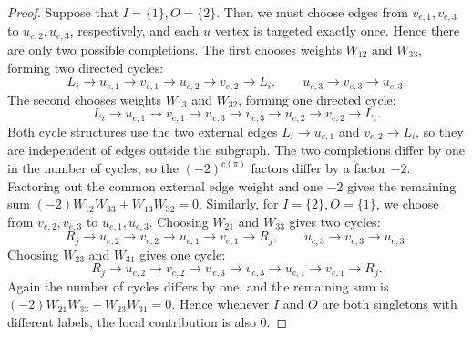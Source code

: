 \documentclass[11pt,a4paper]{article}
\begin{document}
\begin{proof}
Suppose that $I=\{1\},O=\{2\}$. Then we must choose edges from $v_{e,1},v_{e,3}$ to $u_{e,2},u_{e,3}$, respectively, and each $u$ vertex is targeted exactly once. Hence there are only two possible completions. The first chooses weights $W_{12}$ and $W_{33}$, forming two directed cycles:
\[
  L_i\to u_{e,1}\to v_{e,1}\to u_{e,2}
  \to v_{e,2}\to L_i,
  \qquad
  u_{e,3}\to v_{e,3}\to u_{e,3}.
\]
The second chooses weights $W_{13}$ and $W_{32}$, forming one directed cycle:
\[
  L_i\to u_{e,1}\to v_{e,1}\to u_{e,3}
  \to v_{e,3}\to u_{e,2}\to v_{e,2}\to L_i.
\]
Both cycle structures use the two external edges $L_i\to u_{e,1}$ and $v_{e,2}\to L_i$, so they are independent of edges outside the subgraph. The two completions differ by one in the number of cycles, so the $(-2)^{c(\pi)}$ factors differ by a factor $-2$. Factoring out the common external edge weight and one $-2$ gives the remaining sum
$(-2)W_{12}W_{33}+W_{13}W_{32}=0$.
Similarly, for $I=\{2\},O=\{1\}$, we choose from $v_{e,2},v_{e,3}$ to $u_{e,1},u_{e,3}$. Choosing $W_{21}$ and $W_{33}$ gives two cycles:
\[
  R_j\to u_{e,2}\to v_{e,2}\to u_{e,1}
  \to v_{e,1}\to R_j,
  \qquad
  u_{e,3}\to v_{e,3}\to u_{e,3}.
\]
Choosing $W_{23}$ and $W_{31}$ gives one cycle:
\[
  R_j\to u_{e,2}\to v_{e,2}\to u_{e,3}
  \to v_{e,3}\to u_{e,1}\to v_{e,1}\to R_j.
\]
Again the number of cycles differs by one, and the remaining sum is
$(-2)W_{21}W_{33}+W_{23}W_{31}=0$.
Hence whenever $I$ and $O$ are both singletons with different labels, the local contribution is also $0$.


\end{proof}
\end{document}
